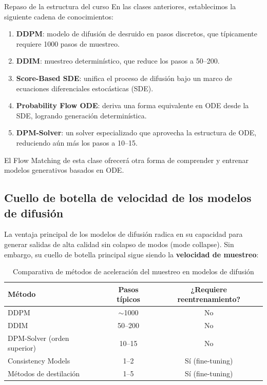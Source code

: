 \documentclass[a4paper]{article}
\begin{document}
\begin{knowledgebox}{Repaso de la estructura del curso}
En las clases anteriores, establecimos la siguiente cadena de conocimientos:
\begin{enumerate}
    \item \textbf{DDPM}: modelo de difusión de desruido en pasos discretos, que típicamente requiere 1000 pasos de muestreo.
    \item \textbf{DDIM}: muestreo determinístico, que reduce los pasos a 50--200.
    \item \textbf{Score-Based SDE}: unifica el proceso de difusión bajo un marco de ecuaciones diferenciales estocásticas (SDE).
    \item \textbf{Probability Flow ODE}: deriva una forma equivalente en ODE desde la SDE, logrando generación determinística.
    \item \textbf{DPM-Solver}: un solver especializado que aprovecha la estructura de ODE, reduciendo aún más los pasos a 10--15.
\end{enumerate}
El Flow Matching de esta clase ofrecerá otra forma de comprender y entrenar modelos generativos basados en ODE.
\end{knowledgebox}

\subsection{Cuello de botella de velocidad de los modelos de difusión}

La ventaja principal de los modelos de difusión radica en su capacidad para generar salidas de alta calidad sin colapso de modos (mode collapse). Sin embargo, su cuello de botella principal sigue siendo la \textbf{velocidad de muestreo}:

\begin{table}[H]
\centering
\begin{tabular}{lcc}
\toprule
\textbf{Método} & \textbf{Pasos típicos} & \textbf{¿Requiere reentrenamiento?} \\
\midrule
DDPM & $\sim$1000 & No \\
DDIM & 50--200 & No \\
DPM-Solver (orden superior) & 10--15 & No \\
Consistency Models & 1--2 & Sí (fine-tuning) \\
Métodos de destilación & 1--5 & Sí (fine-tuning) \\
\bottomrule
\end{tabular}
\caption{Comparativa de métodos de aceleración del muestreo en modelos de difusión}
\end{table}
\end{document}
